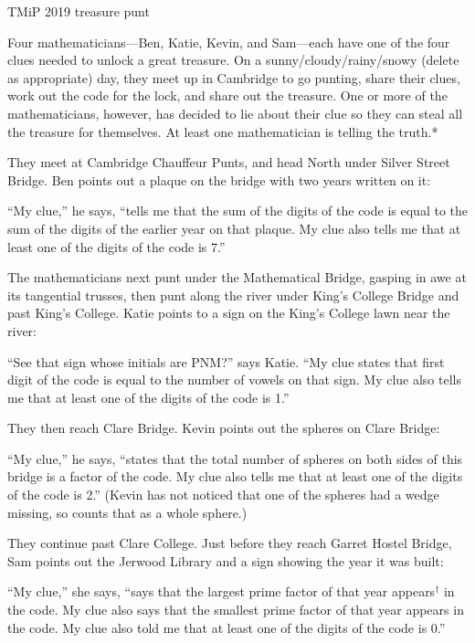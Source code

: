 \documentclass[11pt]{article}
\newcommand{\CDtitle}[1]{
{\setmainfont{Raleway SemiBold}\LARGE #1}\par
}
\newlength{\defaultparskip}
\begin{document}
\hfill%
\begin{minipage}[t][192mm]{132mm}
\setlength{\parskip}{\defaultparskip}

\CDtitle{TMiP 2019 treasure punt}
Four mathematicians---Ben, Katie, Kevin, and Sam---each have one of the four clues needed to unlock a great treasure.
On a sunny/cloudy/rainy/snowy (delete as appropriate) day, they meet up in Cambridge to go punting, share their clues, work out the code for the lock,
and share out the treasure. One or more of the mathematicians, however, has decided to lie about their clue so they can steal all the treasure for themselves.
At least one mathematician is telling the truth.*

They meet at Cambridge Chauffeur Punts, and head North under Silver Street Bridge. Ben points out a plaque on the bridge with two years written on it:

``My clue,'' he says, ``tells me that the sum of the digits of the code is equal to the sum of the digits of the earlier year on that plaque. My clue also tells me that at least one of the digits of the code is 7.''

The mathematicians next punt under the Mathematical Bridge, gasping in awe at its tangential trusses, then punt along the river under King's College Bridge and past King's College.
Katie points to a sign on the King's College lawn near the river:

``See that sign whose initials are PNM?'' says Katie. ``My clue states that first digit of the code is equal to the number of vowels on that sign.
My clue also tells me that at least one of the digits of the code is 1.''

They then reach Clare Bridge. Kevin points out the spheres on Clare Bridge:

``My clue,'' he says, ``states that the total number of spheres on both sides of this bridge is a factor of the code. My clue also tells me that at least one of the digits of the code is 2.''
(Kevin has not noticed that one of the spheres had a wedge missing, so counts that as a whole sphere.)

They continue past Clare College. Just before they reach Garret Hostel Bridge, Sam points out the Jerwood Library and a sign showing the year it was built:

``My clue,'' she says, ``says that the largest prime factor of that year appears$^\text{†}$ in the code.
My clue also says that the smallest prime factor of that year appears in the code. My clue also told me that at least one of the digits of the code is 0.''


\end{minipage}
\end{document}
